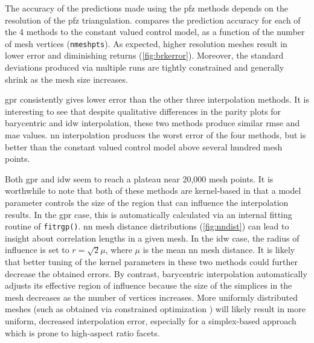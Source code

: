 \documentclass[preprint,12pt]{elsarticle}
\begin{document}
The accuracy of the predictions made using the \gls{pfz} methods depends on the resolution of the \gls{pfz} triangulation.  compares the prediction accuracy for each of the 4 methods to the constant valued control model, as a function of the number of mesh vertices (\texttt{nmeshpts}). As expected, higher resolution meshes result in lower error and diminishing returns (\cref{fig:brkerror}). Moreover, the standard deviations produced via multiple runs are tightly constrained and generally shrink as the mesh size increases. 

\Gls{gpr} consistently gives lower error than the other three interpolation methods. It is interesting to see that despite qualitative differences in the parity plots for barycentric and \gls{idw} interpolation, these two methods produce similar \gls{rmse} and \gls{mae} values. \Gls{nn} interpolation produces the worst error of the four methods, but is better than the constant valued control model above several hundred mesh points. 

Both \gls{gpr} and \gls{idw} seem to reach a plateau near 20,000 mesh points. It is worthwhile to note that both of these methods are kernel-based in that a model parameter controls the size of the region that can influence the interpolation results. In the \gls{gpr} case, this is automatically calculated via an internal fitting routine of \texttt{fitrgp()}. \gls{nn} mesh distance distributions (\cref{fig:nndist}) can lead to insight about correlation lengths in a given mesh. In the \gls{idw} case, the radius of influence is set to $r=\sqrt{2} \mu$, where $\mu$ is the mean \gls{nn} mesh distance. It is likely that better tuning of the kernel parameters in these two methods could further decrease the obtained errors. By contrast, barycentric interpolation automatically adjusts its effective region of influence because the size of the simplices in the mesh decreases as the number of vertices increases. More uniformly distributed meshes (such as obtained via constrained optimization \cite{dolanBenchmarkingOptimizationSoftware2004,ConstrainedElectrostaticNonlinear2020}) will likely result in more uniform, decreased interpolation error, especially for a simplex-based approach which is prone to high-aspect ratio facets. %

\end{document}
